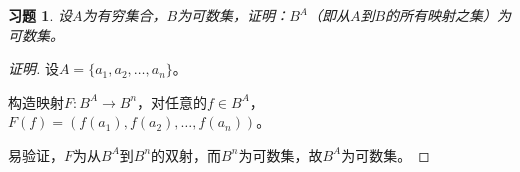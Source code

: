 \documentclass{article}
\begin{document}
\begin{CJK}{UTF8}{gbsn}
\newtheorem*{Ex}{习题}
\begin{Ex}
设$A$为有穷集合，$B$为可数集，证明：$B^A$（即从$A$到$B$的所有映射之集）为可数集。
\end{Ex}
\begin{proof}[证明]
  设$A=\{a_1,a_2,\ldots,a_n\}$。

  构造映射$F:B^A\to B^n$，对任意的$f\in B^A$，$F(f)=(f(a_1),f(a_2),\ldots,f(a_n))$。

  易验证，$F$为从$B^A$到$B^n$的双射，而$B^n$为可数集，故$B^A$为可数集。
\end{proof}
\end{CJK}
\end{document}
